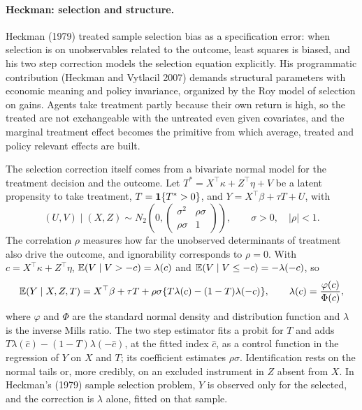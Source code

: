 \paragraph{Heckman: selection and structure.} Heckman (1979) treated sample selection bias as a specification error: when selection is on unobservables related to the outcome, least squares is biased, and his two step correction models the selection equation explicitly. His programmatic contribution (Heckman and Vytlacil 2007) demands structural parameters with economic meaning and policy invariance, organized by the Roy model of selection on gains. Agents take treatment partly because their own return is high, so the treated are not exchangeable with the untreated even given covariates, and the marginal treatment effect becomes the primitive from which average, treated and policy relevant effects are built.

The selection correction itself comes from a bivariate normal model for the treatment decision and the outcome. Let $T^\ast=X^\top\kappa+Z^\top\eta+V$ be a latent propensity to take treatment, $T=\mathbf{1}\{T^\ast>0\}$, and $Y=X^\top\beta+\tau T+U$, with
\[
(U,V)\mid(X,Z)\sim N_2\!\left(0,\begin{pmatrix}\sigma^2 & \rho\sigma\\ \rho\sigma & 1\end{pmatrix}\right),\qquad \sigma>0,\quad |\rho|<1.
\]
The correlation $\rho$ measures how far the unobserved determinants of treatment also drive the outcome, and ignorability corresponds to $\rho=0$. With $c=X^\top\kappa+Z^\top\eta$, $\mathbb{E}(V\mid V>-c)=\lambda(c)$ and $\mathbb{E}(V\mid V\le -c)=-\lambda(-c)$, so
\begin{equation}\label{ss:eq:mills}
\mathbb{E}(Y\mid X,Z,T)=X^\top\beta+\tau T+\rho\sigma\{T\lambda(c)-(1-T)\lambda(-c)\},\qquad \lambda(c)=\frac{\varphi(c)}{\Phi(c)},
\end{equation}
where $\varphi$ and $\Phi$ are the standard normal density and distribution function and $\lambda$ is the inverse Mills ratio. The two step estimator fits a probit for $T$ and adds $T\lambda(\hat c)-(1-T)\lambda(-\hat c)$, at the fitted index $\hat c$, as a control function in the regression of $Y$ on $X$ and $T$; its coefficient estimates $\rho\sigma$. Identification rests on the normal tails or, more credibly, on an excluded instrument in $Z$ absent from $X$. In Heckman's (1979) sample selection problem, $Y$ is observed only for the selected, and the correction is $\lambda$ alone, fitted on that sample.

